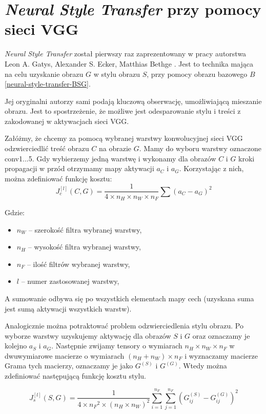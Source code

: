 \section{\textit{Neural Style Transfer} przy pomocy sieci VGG}
\label{vgg-nst}
\textit{Neural Style Transfer} został pierwszy raz zaprezentowany w pracy autorstwa Leon A. Gatys, Alexander S. Ecker, Matthias Bethge \cite{nstpaper}.
Jest to technika mająca na celu uzyskanie obrazu \(G\) w stylu obrazu \(S\), przy pomocy obrazu bazowego \(B\) \ref{neural-style-transfer-BSG}.

Jej oryginalni autorzy sami podają kluczową obserwację, umożliwiającą mieszanie obrazu. Jest to spostrzeżenie, że możliwe jest odesparowanie stylu
i treści z zakodowanej w aktywacjach sieci VGG.

Załóżmy, że chcemy za pomocą wybranej warstwy konwolucyjnej sieci VGG odzwierciedlić treść obrazu \(C\) na obrazie \(G\). Mamy do wyboru warstwy oznaczone conv1...5.
Gdy wybierzemy jedną warstwę i wykonamy dla obrazów \(C\) i \(G\) kroki propagacji w przód otrzymamy mapy aktywacji \(a_{C}\) i \(a_{G}\). Korzystając z nich, można zdefiniować
funkcję kosztu: \[J_{c}^{[l]}(C, G) = \frac{1}{4 \times n_H \times n_W \times n_F} \sum{(a_{C} - a_{G})^{2}} \]

Gdzie:

\begin{itemize}
\item
    \(n_{W}\) -- szerokość filtra wybranej warstwy,
\item
    \(n_{H}\) -- wysokość filtra wybranej warstwy,
\item
    \(n_{F}\) -- ilość filtrów wybranej warstwy,
\item
    \(l\) -- numer zastosowanej warstwy,
\end{itemize}

A sumowanie odbywa się po wszystkich elementach mapy cech (uzyskana suma jest sumą aktywacji wszystkich warstw). 

Analogicznie można potraktować problem odzwierciedlenia stylu obrazu. Po wyborze warstwy uzyskujemy aktywację dla obrazów \(S\) i \(G\) oraz oznaczamy je kolejno \(a_{S}\) i \(a_{G}\). 
Następnie zwijamy tensory o wymiarach \(n_H \times n_W \times n_F\) w dwuwymiarowe macierze o wymiarach \((n_H + n_W) \times n_F\) i wyznaczamy macierze Grama tych macierzy, oznaczamy je jako 
\(G^{(S)}\) i \(G^{(G)}\). Wtedy można zdefiniować następującą funkcję kosztu stylu.

\[J_{s}^{[l]}(S,G) = \frac{1}{4 \times {n_F}^2 \times (n_H \times n_W)^2} \sum _{i=1}^{n_F}\sum_{j=1}^{n_F}(G^{(S)}_{ij} - G^{(G)}_{ij})^2\tag{2}\]

